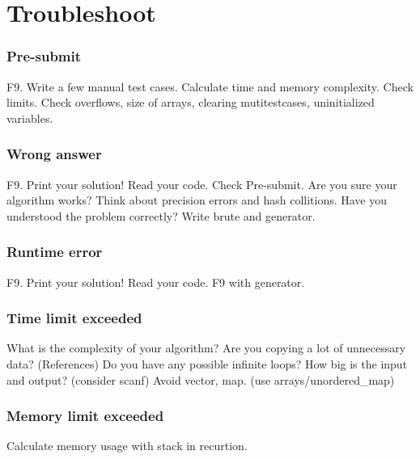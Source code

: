 \section{Troubleshoot}
\subsubsection{Pre-submit}
F9.
Write a few manual test cases.
Calculate time and memory complexity. Check limits.
Check overflows, size of arrays, 
clearing mutitestcases, uninitialized variables.

\subsubsection{Wrong answer}
F9.
Print your solution!
Read your code.
Check Pre-submit.
Are you sure your algorithm works?
Think about precision errors and hash collitions.
Have you understood the problem correctly?
Write brute and generator.


\subsubsection{Runtime error}
F9.
Print your solution!
Read your code.
F9 with generator.


\subsubsection{Time limit exceeded}
What is the complexity of your algorithm?
Are you copying a lot of unnecessary data? (References)
Do you have any possible infinite loops?
How big is the input and output? (consider scanf)
Avoid vector, map. (use arrays/unordered\_map)

\subsubsection{Memory limit exceeded}
Calculate memory usage with stack in recurtion.
